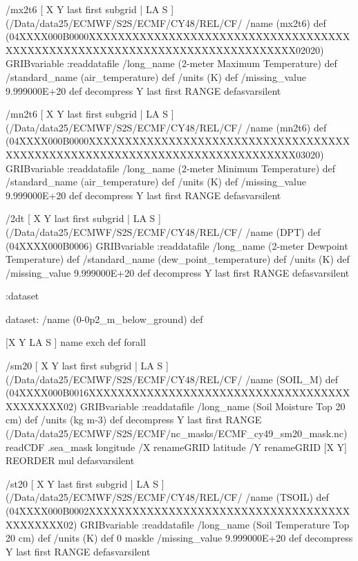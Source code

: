 \begin{ingrid}
/mx2t6 { [ X Y last first subgrid | LA S ] (/Data/data25/ECMWF/S2S/ECMF/CY48/REL/CF/%
/name (mx2t6) def
(04XXXX000B0000XXXXXXXXXXXXXXXXXXXXXXXXXXXXXXXXXXXXXXXXXXXXXXXXXXXXXXXXXXXXXXXXXXXXXXXXXXXX02020) GRIBvariable
:readdatafile
/long_name (2-meter Maximum Temperature) def
/standard_name (air_temperature) def
/units (K) def
/missing_value 9.999000E+20 def
decompress
Y last first RANGE
} defasvarsilent

/mn2t6 { [ X Y last first subgrid | LA S ] (/Data/data25/ECMWF/S2S/ECMF/CY48/REL/CF/%
/name (mn2t6) def
(04XXXX000B0000XXXXXXXXXXXXXXXXXXXXXXXXXXXXXXXXXXXXXXXXXXXXXXXXXXXXXXXXXXXXXXXXXXXXXXXXXXXX03020) GRIBvariable
:readdatafile
/long_name (2-meter Minimum Temperature) def
/standard_name (air_temperature) def
/units (K) def
/missing_value 9.999000E+20 def
decompress
Y last first RANGE
} defasvarsilent

/2dt { [ X Y last first subgrid | LA S ] (/Data/data25/ECMWF/S2S/ECMF/CY48/REL/CF/%
/name (DPT) def
(04XXXX000B0006) GRIBvariable
:readdatafile
/long_name (2-meter Dewpoint Temperature) def
/standard_name (dew_point_temperature) def
/units (K) def
/missing_value 9.999000E+20 def
decompress
Y last first RANGE
} defasvarsilent

:dataset

dataset:
/name (0-0p2_m_below_ground) def

[X Y LA S ] {name exch def } forall

/sm20 { [ X Y last first subgrid | LA S ] (/Data/data25/ECMWF/S2S/ECMF/CY48/REL/CF/%
/name (SOIL_M) def
(04XXXX000B0016XXXXXXXXXXXXXXXXXXXXXXXXXXXXXXXXXXXXXXXXXXXX02) GRIBvariable
:readdatafile
/long_name (Soil Moisture Top 20 cm) def
/units (kg m-3) def
decompress
 Y last first RANGE
 (/Data/data25/ECMWF/S2S/ECMF/nc_masks/ECMF_cy49_sm20_mask.nc) readCDF .sea_mask
   longitude /X renameGRID
   latitude /Y renameGRID
   [X Y] REORDER
mul
} defasvarsilent


/st20 { [ X Y last first subgrid | LA S ] (/Data/data25/ECMWF/S2S/ECMF/CY48/REL/CF/%
/name (TSOIL) def
(04XXXX000B0002XXXXXXXXXXXXXXXXXXXXXXXXXXXXXXXXXXXXXXXXXXXX02) GRIBvariable
:readdatafile
/long_name (Soil Temperature Top 20 cm) def
/units (K) def
0 maskle
/missing_value 9.999000E+20 def
decompress
Y last first RANGE
} defasvarsilent


\end{ingrid}
